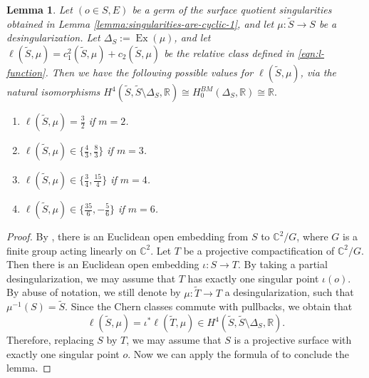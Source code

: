 \documentclass[12pt]{amsart}
\newcommand{\<}{\leq}
\newcommand{\D}{\Delta}
\newtheorem{lemma}[theorem]{Lemma}
\theoremstyle{remark}
\theoremstyle{definition}
\theoremstyle{definition}
\numberwithin{equation}{section}
\theoremstyle{definition}
\theoremstyle{definition}
\def\Ex{\operatorname{Ex}}
\begin{document}
\begin{lemma}
\label{lemma:possilbe-a_i-1}
Let $(o\in S,E)$ be a germ of the surface quotient singularities obtained in Lemma \ref{lemma:singularities-are-cyclic-1}, 
and let $\mu\colon \widetilde{S} \to S$ be a desingularization. 
Let $\Delta_S:=\Ex(\mu)$, and let $\ell(\widetilde{S}, \mu) = c_1^2(\widetilde{S}, \mu) + c_2(\widetilde{S}, \mu)$ be the relative class defined in \eqref{eqn:l-function}.
Then we have the following possible values for $\ell(\widetilde{S}, \mu)$, \textit{via} the natural isomorphisms  
$H^4(\widetilde{S}, \widetilde{S}\setminus \Delta_S, \mathbb{R}) \cong H^{BM}_0(\Delta_S, \mathbb{R}) \cong \mathbb{R}.$ 
\begin{enumerate}
\item $\ell(\widetilde{S}, \mu) = \frac{3}{2}$ if $m=2$.
\item $\ell(\widetilde{S}, \mu) \in \{ \frac{4}{3}, \frac{8}{3} \}$ if $m=3$.
\item $\ell(\widetilde{S}, \mu) \in \{ \frac{3}{4}, \frac{15}{4} \}$ if $m=4$. 
\item $\ell(\widetilde{S}, \mu) \in \{ \frac{35}{6}, -\frac{5}{6} \}$ if $m=6$.
\end{enumerate}
\end{lemma} 
\begin{proof}
By \cite[Lemma 9.9]{Kaw88}, there is an Euclidean open embedding from $ S$ to  $\mathbb{C}^2/G$, where $G$ is a finite group acting linearly on $\mathbb{C}^2$. 
Let $T$ be a projective compactification of $\mathbb{C}^2/G.$ 
Then there is an Euclidean open embedding $\iota\colon S \to T$. 
By taking a partial desingularization, we may assume that $T$ has exactly one singular point $\iota(o)$.  
By abuse of notation, we still denote by $\mu\colon \widetilde{T} \to T$ a desingularization, such that $\mu^{-1}(S) = \widetilde{S}$. 
Since the Chern classes commute with pullbacks, we obtain that 
\[
\ell(\widetilde{S}, \mu) = \iota^*\ell(\widetilde{T}, \mu) \in H^4(\widetilde{S}, \widetilde{S}\setminus \D_S, \mathbb{R}). 
\]
Therefore, replacing $S$ by $T$, we may assume that $S$ is a projective surface with exactly one singular point $o$. 
Now we can apply the formula of \cite[Equation (14.3.1.2)]{Kol92} to conclude the lemma. 
\end{proof}
\end{document}
